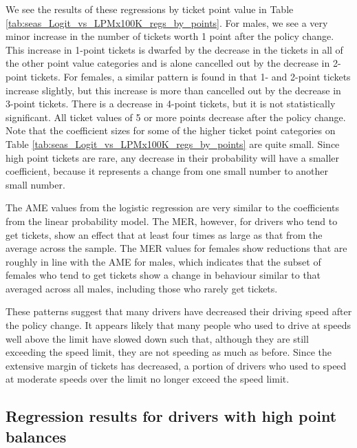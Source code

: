 We see the results of these regressions by ticket point value in 
Table \ref{tab:seas_Logit_vs_LPMx100K_regs_by_points}. 
For males, we see a very minor increase in the number of tickets 
worth 1 point after the policy change. 
This increase in 1-point tickets is dwarfed by the decrease in the tickets 
in all of the other point value categories and is alone cancelled out 
by the decrease in 2-point tickets. 
For females, a similar pattern is found in that 1- and 2-point tickets increase slightly,
but this increase is more than cancelled out by the decrease in 3-point tickets. 
There is a decrease in 4-point tickets, but it is not statistically significant. 
All ticket values of 5 or more points decrease after the policy change. 
Note that the coefficient sizes for some of the higher ticket point categories on 
Table \ref{tab:seas_Logit_vs_LPMx100K_regs_by_points}
are quite small. Since high point tickets are rare, any decrease in their probability will have a smaller coefficient, 
because it represents a change from one small number to another small number.

The AME values from the logistic regression are very similar to
the coefficients from the linear probability model. 
The MER, however, for drivers who tend to get tickets, 
show an effect that at least four times as large 
as that from the average across the sample. 
The MER values for females show reductions 
that are roughly in line with the AME for males, 
which indicates that the subset of females who tend to get tickets
show a change in behaviour similar to that 
averaged across all males, including those who rarely get tickets. 


These patterns suggest that many drivers have decreased their driving speed 
after the policy change. 
It appears likely that many people who used to drive at speeds well above the limit 
have slowed down such that, although they are still exceeding the speed limit, 
they are not speeding as much as before. 
Since the extensive margin of tickets has decreased, a portion of drivers who used to speed at moderate speeds over the limit 
no longer exceed the speed limit.

\subsection{Regression results for drivers with high point balances}
\label{sec:Empirical_high_pts}





